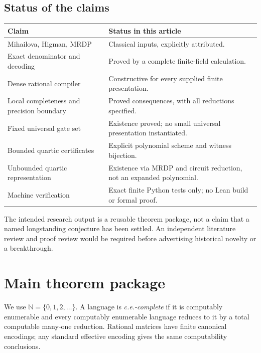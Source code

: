 \documentclass[11pt,letterpaper]{article}
\numberwithin{equation}{section}
\theoremstyle{definition}
\theoremstyle{remark}
\newcommand{\N}{\mathbb N}
\newcommand{\srcmark}[1]{\par\noindent{\small\itshape [source~#1]}\par}
\begin{document}
\subsection{Status of the claims}
\begin{center}
\begin{tabular}{p{}p{}}
\toprule
Claim & Status in this article\\
\midrule
Mihailova, Higman, MRDP & Classical inputs, explicitly attributed.\\
Exact denominator and decoding & Proved by a complete finite-field calculation.\\
Dense rational compiler & Constructive for every supplied finite presentation.\\
Local completeness and precision boundary & Proved consequences, with all reductions specified.\\
Fixed universal gate set & Existence proved; no small universal presentation instantiated.\\
Bounded quartic certificates & Explicit polynomial scheme and witness bijection.\\
Unbounded quartic representation & Existence via MRDP and circuit reduction, not an expanded polynomial.\\
Machine verification & Exact finite Python tests only; no Lean build or formal proof.\\
\bottomrule
\end{tabular}
\end{center}

The intended research output is a reusable theorem package, not a claim
that a named longstanding conjecture has been settled. An independent
literature review and proof review would be required before advertising
historical novelty or a breakthrough.

\section{Main theorem package}
\label{pqc:dr:sec:main}
\srcmark{16}

We use $\N=\{0,1,2,\ldots\}$. A language is \emph{c.e.-complete} if it is
computably enumerable and every computably enumerable language reduces to
it by a total computable many-one reduction. Rational matrices have finite
canonical encodings; any standard effective encoding gives the same
computability conclusions.
\end{document}
